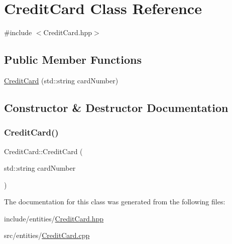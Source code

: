 \hypertarget{class_credit_card}{}\section{Credit\+Card Class Reference}
\label{class_credit_card}


{\ttfamily \#include $<$Credit\+Card.\+hpp$>$}

\subsection*{Public Member Functions}
\begin{DoxyCompactItemize}
\item 
\mbox{\hyperlink{class_credit_card_ae1d0fab3098057b4514355c2173559fd}{Credit\+Card}} (std\+::string card\+Number)
\end{DoxyCompactItemize}


\subsection{Constructor \& Destructor Documentation}
\mbox{\label{class_credit_card_ae1d0fab3098057b4514355c2173559fd}} 
\subsubsection{\texorpdfstring{CreditCard()}{CreditCard()}}
{\footnotesize\ttfamily Credit\+Card\+::\+Credit\+Card (\begin{DoxyParamCaption}\item[{std\+::string}]{card\+Number }\end{DoxyParamCaption})}



The documentation for this class was generated from the following files\+:\begin{DoxyCompactItemize}
\item 
include/entities/\mbox{\hyperlink{_credit_card_8hpp}{Credit\+Card.\+hpp}}\item 
src/entities/\mbox{\hyperlink{_credit_card_8cpp}{Credit\+Card.\+cpp}}\end{DoxyCompactItemize}
